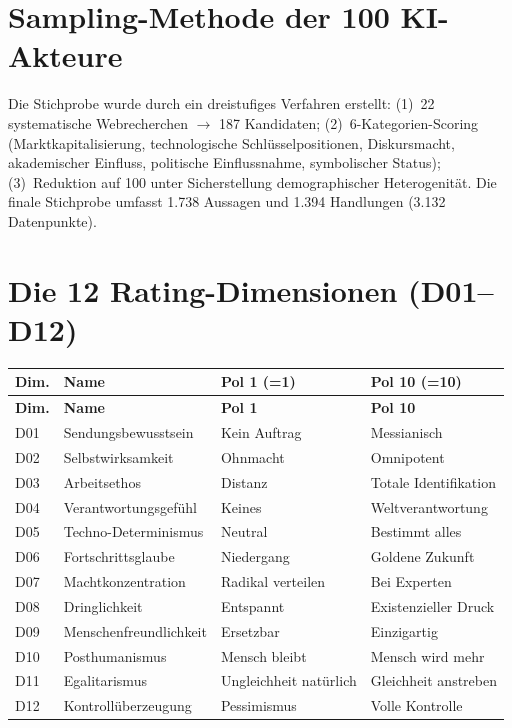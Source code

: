 \documentclass[12pt,a4paper]{article}
\begin{document}
\newpage
\appendix

\section{Sampling-Methode der 100 KI-Akteure}
\label{app:sampling}

Die Stichprobe wurde durch ein dreistufiges Verfahren erstellt: (1)~22 systematische Webrecherchen $\to$ 187 Kandidaten; (2)~6-Kategorien-Scoring (Marktkapitalisierung, technologische Schl\"usselpositionen, Diskursmacht, akademischer Einfluss, politische Einflussnahme, symbolischer Status); (3)~Reduktion auf 100 unter Sicherstellung demographischer Heterogenit\"at. Die finale Stichprobe umfasst 1.738 Aussagen und 1.394 Handlungen (3.132 Datenpunkte).


\section{Die 12 Rating-Dimensionen (D01--D12)}
\label{app:dimensionen}

\begin{longtable}{l l l l}
  \toprule
  \textbf{Dim.} & \textbf{Name} & \textbf{Pol 1 (=1)} & \textbf{Pol 10 (=10)} \\
  \midrule
  \endfirsthead
  \toprule
  \textbf{Dim.} & \textbf{Name} & \textbf{Pol 1} & \textbf{Pol 10} \\
  \midrule
  \endhead
  D01 & Sendungsbewusstsein & Kein Auftrag & Messianisch \\
  D02 & Selbstwirksamkeit & Ohnmacht & Omnipotent \\
  D03 & Arbeitsethos & Distanz & Totale Identifikation \\
  D04 & Verantwortungsgef\"uhl & Keines & Weltverantwortung \\
  D05 & Techno-Determinismus & Neutral & Bestimmt alles \\
  D06 & Fortschrittsglaube & Niedergang & Goldene Zukunft \\
  D07 & Machtkonzentration & Radikal verteilen & Bei Experten \\
  D08 & Dringlichkeit & Entspannt & Existenzieller Druck \\
  D09 & Menschenfreundlichkeit & Ersetzbar & Einzigartig \\
  D10 & Posthumanismus & Mensch bleibt & Mensch wird mehr \\
  D11 & Egalitarismus & Ungleichheit nat\"urlich & Gleichheit anstreben \\
  D12 & Kontroll\"uberzeugung & Pessimismus & Volle Kontrolle \\
  \bottomrule
\end{longtable}
\end{document}
